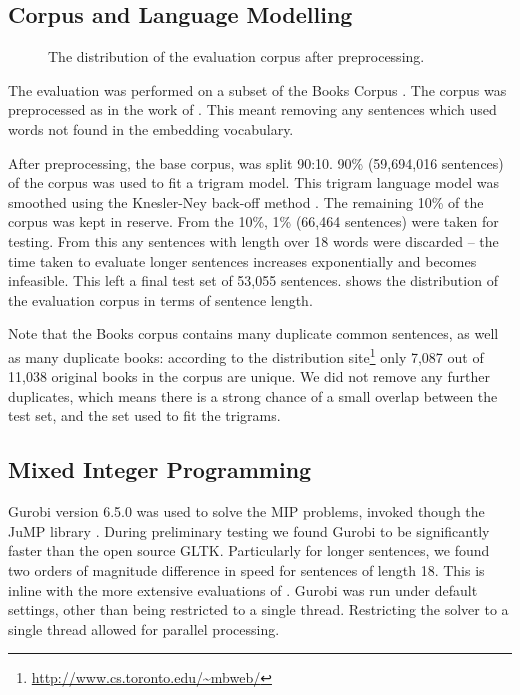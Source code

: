 \documentclass[11pt]{article}
\theoremstyle{plain}
\theoremstyle{definition}
\newcommand{\parencite}{\protect\cite}
\newcommand{\textcite}{\protect\newcite}
\begin{document}
\subsection{Corpus and Language Modelling}
\begin{figure}
	\caption{\label{fig:corpus} The distribution of the evaluation corpus after preprocessing.}
\end{figure}

The evaluation was performed on a subset of the Books Corpus \parencite{moviebook}. The corpus was preprocessed as in the work of \textcite{White2015BOWgen}. This meant removing any sentences which used words not found in the embedding vocabulary.

After preprocessing, the base corpus, was split 90:10. 90\% (59,694,016 sentences) of the corpus was used to fit a trigram model. This trigram language model was smoothed using the Knesler-Ney back-off method \parencite{kneser1995improved}. The remaining 10\% of the corpus was kept in reserve. From the 10\%, 1\% (66,464 sentences) were taken for testing. From this any sentences with length over 18 words were discarded -- the time taken to evaluate longer sentences increases exponentially and becomes infeasible. This left a final test set of 53,055 sentences.  shows the distribution of the evaluation corpus in terms of sentence length.
 
Note that the Books corpus contains many duplicate common sentences, as well as many duplicate books: according to the distribution site\footnote{\url{http://www.cs.toronto.edu/~mbweb/}} only 7,087 out of 11,038 original books in the corpus are unique. We did not remove any further duplicates, which means there is a strong chance of a small overlap between the test set, and the set used to fit the trigrams.
 

\subsection{Mixed Integer Programming}
Gurobi version 6.5.0 was used to solve the MIP problems, invoked though the JuMP library \parencite{jump}. During preliminary testing we found Gurobi to be significantly faster than the open source GLTK. Particularly for longer sentences, we found two orders of magnitude difference in speed for sentences of length 18. This is inline with the more extensive evaluations of \textcite{meindl2012analysis}. Gurobi was run under default settings, other than being restricted to a single thread. Restricting the solver to a single thread allowed for parallel processing.
\end{document}
